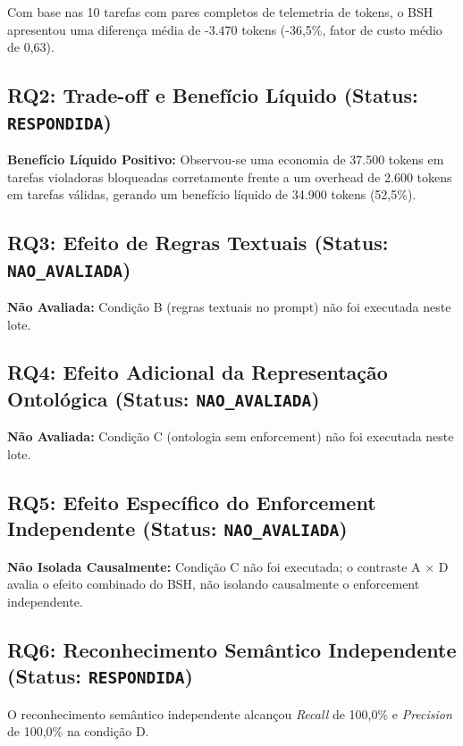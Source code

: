 \documentclass[10pt,a4paper]{article}
\begin{document}
Com base nas 10 tarefas com pares completos de telemetria de tokens, o BSH apresentou uma diferença média de -3.470 tokens (-36,5\%, fator de custo médio de 0,63).

\subsection{RQ2: Trade-off e Benefício Líquido (Status: \texttt{RESPONDIDA})}

\textbf{Benefício Líquido Positivo:} Observou-se uma economia de 37.500 tokens em tarefas violadoras bloqueadas corretamente frente a um overhead de 2.600 tokens em tarefas válidas, gerando um benefício líquido de 34.900 tokens (52,5\%).

\subsection{RQ3: Efeito de Regras Textuais (Status: \texttt{NAO\_AVALIADA})}

\textbf{Não Avaliada:} Condição B (regras textuais no prompt) não foi executada neste lote.

\subsection{RQ4: Efeito Adicional da Representação Ontológica (Status: \texttt{NAO\_AVALIADA})}

\textbf{Não Avaliada:} Condição C (ontologia sem enforcement) não foi executada neste lote.

\subsection{RQ5: Efeito Específico do Enforcement Independente (Status: \texttt{NAO\_AVALIADA})}

\textbf{Não Isolada Causalmente:} Condição C não foi executada; o contraste A × D avalia o efeito combinado do BSH, não isolando causalmente o enforcement independente.

\subsection{RQ6: Reconhecimento Semântico Independente (Status: \texttt{RESPONDIDA})}

O reconhecimento semântico independente alcançou \emph{Recall} de 100,0\% e \emph{Precision} de 100,0\% na condição D.
\end{document}
